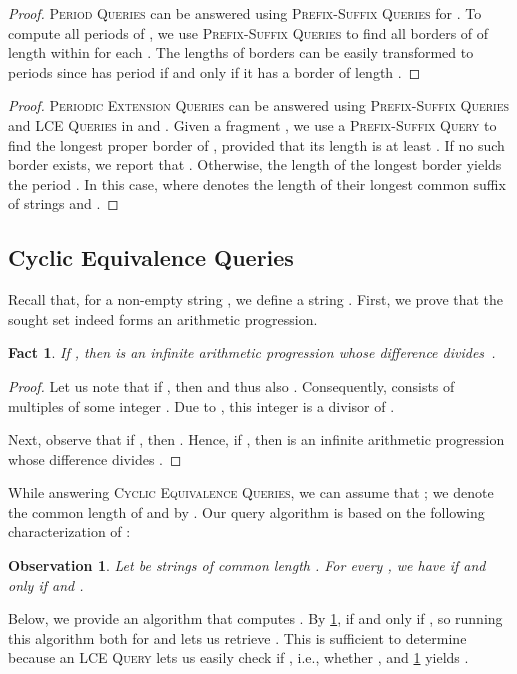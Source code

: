 \documentclass[a4paper]{article}
\newtheorem{fact}[theorem]{Fact}
\newtheorem{observation}[theorem]{Observation}
\theoremstyle{definition}
\theoremstyle{remark}
\newcommand{\PQ}{\textsc{Period Queries}\xspace}
\newcommand{\BQ}{\textsc{Prefix-Suffix Queries}\xspace}
\newcommand{\BQone}{\textsc{Prefix-Suffix Query}\xspace}
\newcommand{\PEQ}{\textsc{Periodic Extension Queries}\xspace}
\newcommand{\FC}{\textsc{Cyclic Equivalence Queries}\xspace}
\newcommand{\LCEQ}{\textsc{LCE Queries}\xspace}
\newcommand{\maybeqed}{}
\begin{document}
\thmappbq*


\thmapppq*

\begin{proof}
\PQ can be answered using \BQ for .
To compute all periods of , we use \BQ to find all borders of  of length within  for each .
The lengths of borders can be easily transformed to periods since  has period  if and only if it has a border of length .
\maybeqed \end{proof}


\thmrun*
\begin{proof}
  \PEQ can be answered using \BQ and \LCEQ in  and .
  Given a fragment , we use a \BQone to find the longest proper border of , provided that its length is at least .
  If no such border exists, we report that .
  Otherwise, the length of the longest border yields the period .
  In this case, 
  where  denotes the length of their longest common suffix of strings  and .
\maybeqed \end{proof}


\subsection{Cyclic Equivalence Queries}\label{sec:FC}

Recall that, for a non-empty string , we define a string .
First, we prove that the sought set 
indeed forms an arithmetic progression.

\begin{fact}\label{fct:FC}
  If , then  is an infinite arithmetic progression whose difference divides~.
\end{fact}
\begin{proof}
  Let us note that if , then  and thus also .
  Consequently,  consists of multiples of some integer .
  Due to , this integer  is a divisor of .

  Next, observe that if , then .
  Hence, if , then  is an infinite arithmetic progression whose difference divides .
\end{proof}

While answering \FC, we can assume that ;
we denote the common length of  and  by .
Our query algorithm is based on the following characterization of :

\begin{observation}\label{obs:rot}
Let  be strings of common length . For every ,
we have  if and only if  and .
\end{observation}


Below, we provide an algorithm that computes .
By \cref{obs:rot},  if and only if , so running this algorithm both for 
and  lets us retrieve .
This is sufficient to determine  because an \textsc{LCE Query} lets us easily check if , i.e., whether , and \cref{fct:FC} yields .
\end{document}
